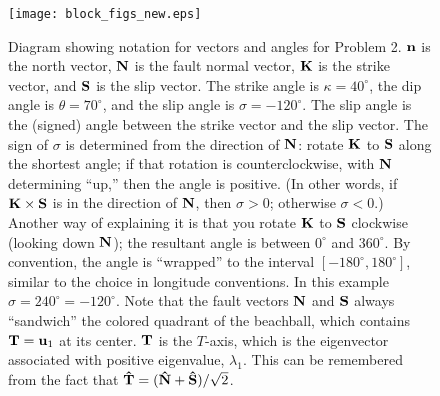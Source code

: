 \begin{figure}
\centering
\texttt{[image: block\_figs\_new.eps]}
\caption[]
{{
Diagram showing notation for vectors and angles for Problem 2.
$\mbox{${\bf n}$}$ is the north vector, $\mbox{${\bf N}$}$ is the fault normal vector, $\mbox{${\bf K}$}$ is the strike vector, and $\mbox{${\bf S}$}$ is the slip vector.
The strike angle is $\kappa = 40^\circ$, the dip angle is $\theta = 70^\circ$, and the slip angle is $\sigma = -120^\circ$.
The slip angle is the (signed) angle between the strike vector and the slip vector.
The sign of $\sigma$ is determined from the direction of $\mbox{${\bf N}$}$: rotate $\mbox{${\bf K}$}$ to $\mbox{${\bf S}$}$ along the shortest angle; if that rotation is counterclockwise, with $\mbox{${\bf N}$}$ determining ``up,'' then the angle is positive. (In other words, if $\mbox{${\bf K}$} \times \mbox{${\bf S}$}$ is in the direction of $\mbox{${\bf N}$}$, then $\sigma > 0$; otherwise $\sigma < 0$.)
Another way of explaining it is that you rotate $\mbox{${\bf K}$}$ to $\mbox{${\bf S}$}$ clockwise (looking down $\mbox{${\bf N}$}$); the resultant angle is between $0^\circ$ and $360^\circ$. By convention, the angle is ``wrapped'' to the interval $[-180^\circ, 180^\circ]$, similar to the choice in longitude conventions. In this example $\sigma = 240^\circ = -120^\circ$.
Note that the fault vectors $\mbox{${\bf N}$}$ and $\mbox{${\bf S}$}$ always ``sandwich'' the colored quadrant of the beachball, which contains $\mbox{${\bf T}$} = \mbox{${\bf u}$}_1$ at its center.
$\mbox{${\bf T}$}$ is the $T$-axis, which is the eigenvector associated with positive eigenvalue, $\lambda_1$.
This can be remembered from the fact that $\mbox{\boldmath{$\hat{\rm T}$}} = (\mbox{\boldmath{$\hat{\rm N}$}} + \mbox{\boldmath{$\hat{\rm S}$}})/\sqrt{2}$.
\label{fig:cmt}
}}
\end{figure}
